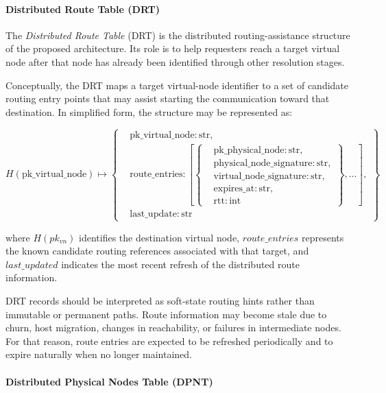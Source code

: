 \documentclass[12pt,a4paper]{article}
\begin{document}
\paragraph{Distributed Route Table (DRT)}

The \textit{Distributed Route Table} (DRT) is the distributed routing-assistance structure of the proposed architecture. Its role is to help requesters reach a target virtual node after that node has already been identified through other resolution stages.

Conceptually, the DRT maps a target virtual-node identifier to a set of candidate routing entry points that may assist starting the communication toward that destination. In simplified form, the structure may be represented as:

\[
H(\mathrm{pk\_virtual\_node}) \mapsto
\left\{
\begin{aligned}
&\mathrm{pk\_virtual\_node}: \mathrm{str},\\
&\mathrm{route\_entries}:
\left[
\left\{
\begin{aligned}
&\mathrm{pk\_physical\_node}: \mathrm{str},\\
&\mathrm{physical\_node\_signature}: \mathrm{str},\\
&\mathrm{virtual\_node\_signature}: \mathrm{str},\\
&\mathrm{expires\_at}: \mathrm{str},\\
&\mathrm{rtt}: \mathrm{int}
\end{aligned}
\right\},
\ldots
\right],\\
&\mathrm{last\_update}: \mathrm{str}
\end{aligned}
\right\}
\]

where \(H(pk_{vn})\) identifies the destination virtual node, \(route\_entries\) represents the known candidate routing references associated with that target, and \(last\_updated\) indicates the most recent refresh of the distributed route information.

DRT records should be interpreted as soft-state routing hints rather than immutable or permanent paths. Route information may become stale due to churn, host migration, changes in reachability, or failures in intermediate nodes. For that reason, route entries are expected to be refreshed periodically and to expire naturally when no longer maintained. 

\paragraph{Distributed Physical Nodes Table (DPNT)}
\end{document}
